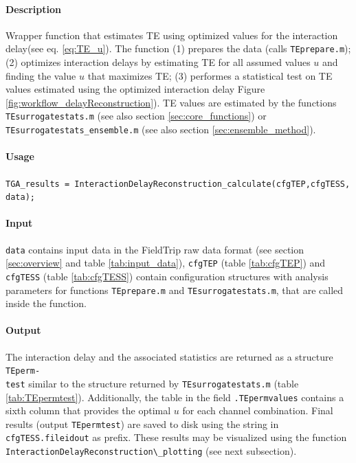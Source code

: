\documentclass[a4paper,10pt]{article}
\begin{document}
\paragraph*{Description} Wrapper function that estimates TE using optimized values for the interaction delay(see eq. \ref{eq:TE_u}). The function (1) prepares the data (calls \verb&TEprepare.m&); (2) optimizes interaction delays by estimating TE for all assumed values $u$ and finding the value $u$ that maximizes TE; (3) performes a statistical test on TE values estimated using the optimized interaction delay Figure \ref{fig:workflow_delayReconstruction}). TE values are estimated by the functions \verb&TEsurrogatestats.m& (see also section \ref{sec:core_functions}) or \verb&TEsurrogatestats_ensemble.m& (see also section \ref{sec:ensemble_method}).

\paragraph*{Usage} \texttt{TGA\_results = InteractionDelayReconstruction\_calculate(cfgTEP,cfgTESS,\\data);}

\paragraph*{Input} \texttt{data} contains input data in the FieldTrip raw data format (see section \ref{sec:overview} and table \ref{tab:input_data}), \verb&cfgTEP& (table \ref{tab:cfgTEP}) and \verb&cfgTESS& (table \ref{tab:cfgTESS}) contain configuration structures with analysis parameters for functions \verb&TEprepare.m& and \verb&TEsurrogatestats.m&, that are called inside the function.

\paragraph*{Output} The interaction delay and the associated statistics are returned as a structure \texttt{TEperm-\\test} similar to the structure returned by \verb&TEsurrogatestats.m& (table \ref{tab:TEpermtest}). Additionally, the table in the field \verb&.TEpermvalues& contains a sixth column that provides the optimal $u$ for each channel combination. Final results (output \texttt{TEpermtest}) are saved to disk using the string in \texttt{cfgTESS.fileidout} as prefix. These results may be visualized using the function \verb&InteractionDelayReconstruction\_plotting& (see next subsection).
\end{document}
